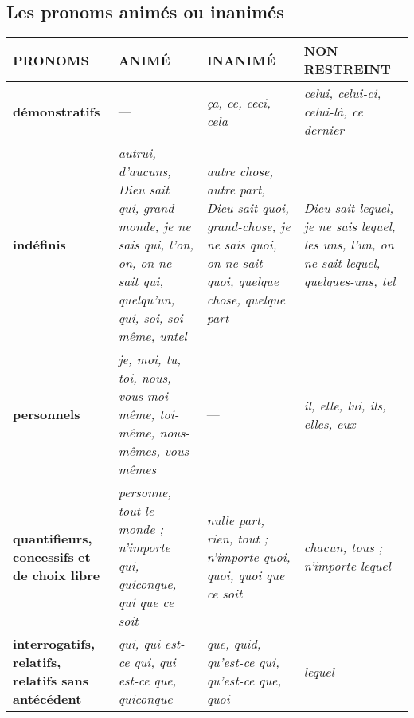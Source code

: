 \documentclass[UTF8]{report}
\begin{document}
\newpage
\subsection{Les pronoms animés ou inanimés}
\begin{longtable}{|>{\raggedright\arraybackslash}p{3cm}|
                    >{\raggedright\arraybackslash}p{3.5cm}|
                    >{\raggedright\arraybackslash}p{3.5cm}|
                    >{\raggedright\arraybackslash}p{3.5cm}|}
\hline
\rowcolor{cyan!20}
\textbf{PRONOMS} & \textbf{ANIMÉ} & \textbf{INANIMÉ} & \textbf{NON RESTREINT} \\
\hline
\textbf{démonstratifs} & --- & \textit{ça, ce, ceci, cela} & \textit{celui, celui-ci, celui-là, ce dernier} \\
\hline
\rowcolor{white}
\textbf{indéfinis} & 
\textit{autrui, d’aucuns, Dieu sait qui,} \newline 
\textit{grand monde, je ne sais qui, l’on, on,} \newline
\textit{on ne sait qui, quelqu’un, qui, soi,} \newline
\textit{soi-même, untel} &
\textit{autre chose, autre part, Dieu sait quoi,} \newline 
\textit{grand-chose, je ne sais quoi,} \newline 
\textit{on ne sait quoi, quelque chose,} \newline 
\textit{quelque part} &
\textit{Dieu sait lequel, je ne sais lequel,} \newline 
\textit{les uns, l’un, on ne sait lequel,} \newline 
\textit{quelques-uns, tel} \\
\hline
\textbf{personnels} & 
\textit{je, moi, tu, toi, nous, vous} \newline 
\textit{moi-même, toi-même, nous-mêmes,} \newline 
\textit{vous-mêmes} & --- &
\textit{il, elle, lui, ils, elles, eux} \\
\hline
\rowcolor{white}
\textbf{quantifieurs, concessifs} \newline 
\textbf{et de choix libre} &
\textit{personne, tout le monde ;} \newline 
\textit{n’importe qui, quiconque,} \newline 
\textit{qui que ce soit} &
\textit{nulle part, rien, tout ;} \newline 
\textit{n’importe quoi, quoi, quoi que ce soit} &
\textit{chacun, tous ;} \newline 
\textit{n’importe lequel} \\
\hline
\textbf{interrogatifs, relatifs,} \newline 
\textbf{relatifs sans antécédent} &
\textit{qui, qui est-ce qui, qui est-ce que,} \newline 
\textit{quiconque} &
\textit{que, quid, qu’est-ce qui,} \newline 
\textit{qu’est-ce que, quoi} &
\textit{lequel} \\
\hline
\end{longtable}
\end{document}
